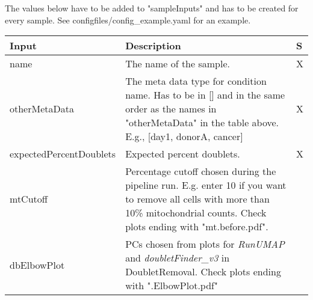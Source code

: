 \newpage

The values below have to be added to "sampleInputs" and has to be created for every sample. See configfiles/config\_example.yaml for an example.

\begin{tabular}{p{4cm} | p{9.5cm} | p{0.1cm}}
	Input & Description & S\\
	\hline
	name & The name of the sample. & X\\
	otherMetaData & The meta data type for condition name. Has to be in [] and in the same order as the names in "otherMetaData" in the table above. E.g., [day1, donorA, cancer] & X\\
	expectedPercentDoublets & Expected percent doublets. & X\\
	mtCutoff & Percentage cutoff chosen during the pipeline run. E.g. enter 10 if you want to remove all cells with more than 10\% mitochondrial counts. Check plots ending with "mt.before.pdf". & \\
	dbElbowPlot & PCs chosen from plots for \textit{RunUMAP} and \textit{doubletFinder\_v3} in DoubletRemoval. Check plots ending with ".ElbowPlot.pdf" & \\
\end{tabular}
